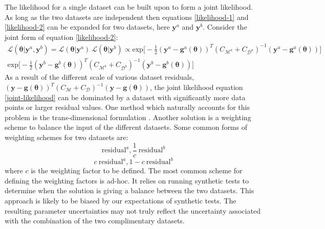 The likelihood for a single dataset can be built upon to form a joint likelihood. As long as the two datasets are independent then equations \ref{likelihood-1} and \ref{likelihood-2} can be expanded for two datasets, here $\bm{y}^a$ and $\bm{y}^b$. Consider the joint form of equation \ref{likelihood-2}:
\begin{multline}
\mathcal{L}(\bm{\theta}|\bm{y}^a,\bm{y}^b) = \mathcal{L}(\bm{\theta}|\bm{y}^a)\ \mathcal{L}(\bm{\theta}|\bm{y}^b)
\propto \text{exp}\bigg[-\frac{1}{2}(\bm{y}^a-\bm{g}^a(\bm{\theta}))^T(C_{\mathcal{M}^a}+C_{\mathcal{D}^a})^{-1}(\bm{y}^a-\bm{g}^a(\bm{\theta}))\bigg]\ \\
\text{exp}\bigg[-\frac{1}{2}(\bm{y}^b-\bm{g}^b(\bm{\theta}))^T(C_{\mathcal{M}^b}+C_{\mathcal{D}^b})^{-1}(\bm{y}^b-\bm{g}^b(\bm{\theta}))\bigg]
\label{joint-likelihood}
\end{multline}
As a result of the different scale of various dataset residuals, $(\bm{y}-\bm{g}(\bm{\theta}))^T(C_{\mathcal{M}}+C_{\mathcal{D}})^{-1}(\bm{y}-\bm{g}(\bm{\theta}))$, the joint likelihood equation \ref{joint-likelihood} can be  dominated by a dataset with significantly more data points or larger residual values. One method which naturally accounts for this problem is the trans-dimensional formulation \citep{Sambridge2006}. Another solution is a weighting scheme to balance the input of the different datasets. Some common forms of weighting schemes for two datasets are:
\begin{equation}
\text{residual}^a, \frac{1}{c}\ \text{residual}^b
\end{equation}
\begin{equation}
c\ \text{residual}^a, 1-c\ \text{residual}^b
\end{equation}
where $c$ is the weighting factor to be defined. The most common scheme for defining the weighting factors is ad-hoc. It relies on running synthetic tests to determine when the solution is giving a balance between the two datasets. This approach is likely to be biased by our expectations of synthetic tests. The resulting parameter uncertainties may not truly reflect the uncertainty associated with the combination of the two complimentary datasets. \par

\vskip 1cm




